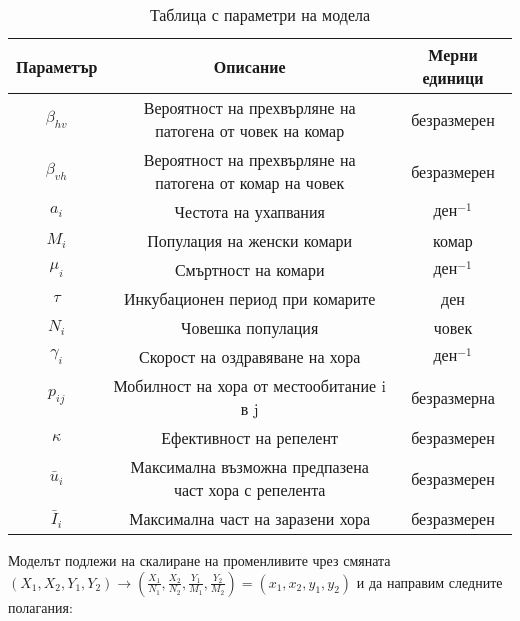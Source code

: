 \begin{table}[h]
  \centering
  \caption{Таблица с параметри на модела}
  \begin{tabular}{ |c c c|  }
    \hline
    Параметър & Описание & Мерни единици\\
    \hline
    $\beta_{hv}$ & Вероятност на прехвърляне на патогена от човек на комар & безразмерен\\
    $\beta_{vh}$ & Вероятност на прехвърляне на патогена от комар на човек & безразмерен\\
    $a_i$ & Честота на ухапвания & $\text{ден}^{-1}$\\
    $M_i$ & Популация на женски комари & комар\\
    $\mu_i$ & Смъртност на комари & $\text{ден}^{-1}$\\
    $\tau$ & Инкубационен период при комарите & ден\\
    $N_i$ & Човешка популация & човек\\
    $\gamma_i$ & Скорост на оздравяване на хора & $\text{ден}^{-1}$\\
    $p_{ij}$ & Мобилност на хора от местообитание i в j & безразмерна\\
    $\kappa$ & Ефективност на репелент & безразмерен\\
    $\bar{u}_i$ & Максимална възможна предпазена част хора с репелента & безразмерен\\
    $\bar{I}_i$ & Максимална част на заразени хора & безразмерен\\
    \hline
  \end{tabular}
  \label{table:1}
\end{table}

Моделът подлежи на скалиране на променливите чрез смяната $(X_1, X_2, Y_1, Y_2) \rightarrow (\frac{X_1}{N_1}, \frac{X_2}{N_2}, \frac{Y_1}{M_1}, \frac{Y_2}{M_2}) = (x_1, x_2, y_1, y_2)$ и да направим следните полагания:

